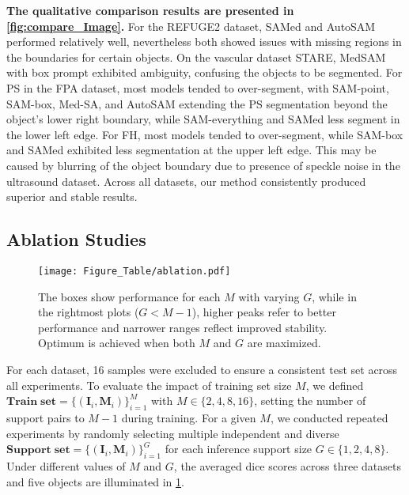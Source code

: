 {\bf The qualitative comparison results are presented in \cref{fig:compare_Image}.} For the REFUGE2 dataset, SAMed and AutoSAM performed relatively well, nevertheless both showed issues with missing regions in the boundaries for certain objects. On the vascular dataset STARE, MedSAM with box prompt exhibited ambiguity, confusing the objects to be segmented. For PS in the FPA dataset, most models tended to over-segment, with SAM-point, SAM-box, Med-SA, and AutoSAM extending the PS segmentation beyond the object’s lower right boundary, while SAM-everything and SAMed less segment in the lower left edge. For FH, most models tended to over-segment, while SAM-box and SAMed exhibited less segmentation at the upper left edge. This may be caused by blurring of the object boundary due to presence of speckle noise in the ultrasound dataset. Across all datasets, our method consistently produced superior and stable results.

\subsection{Ablation Studies}
\begin{figure}[t]
  \centering
  \setlength{\abovecaptionskip}{3pt}
   \texttt{[image: Figure\_Table/ablation.pdf]}
   \caption{The boxes show performance for each \(M\) with varying \(G\), while in the rightmost plots (\(G < M-1\)), higher peaks refer to better performance and narrower ranges reflect improved stability. Optimum is achieved when both \(M\) and \(G\) are maximized.}
   \label{fig:ablation}
   \vspace{-15pt}
\end{figure}

For each dataset, 16 samples were excluded to ensure a consistent test set across all experiments. To evaluate the impact of training set size \( M \), we defined \(\mathbf{Train\; set} = \{ (\mathbf{I}_{i}, \mathbf{M}_{i}) \}_{i=1}^M\) with \( M \in \{2, 4, 8, 16\} \), setting the number of support pairs to \( M-1 \) during training. For a given \( M \), we conducted repeated experiments by randomly selecting multiple independent and diverse \(\mathbf{Support\; set} = \{ (\mathbf{I}_{i}, \mathbf{M}_{i}) \}_{i=1}^G\) for each inference support size \( G \in \{1, 2, 4, 8\} \). Under different values of \( M \) and \( G \), the averaged dice scores across three datasets and five objects are illuminated in \cref{fig:ablation}. 

